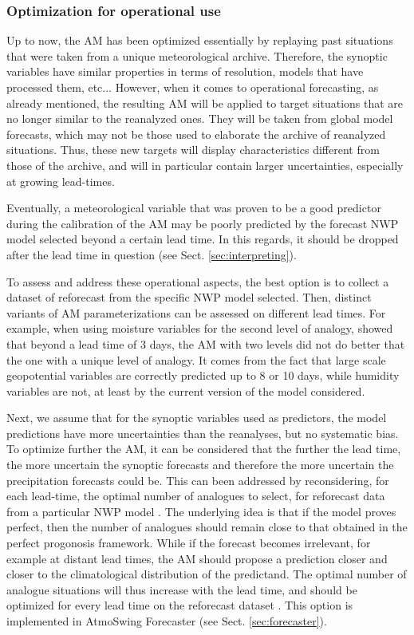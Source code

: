 \documentclass[review]{elsarticle}
\begin{document}
\subsubsection{Optimization for operational use}
\label{sec:optimization-operational}

Up to now, the AM has been optimized essentially by replaying past situations that were taken from a unique meteorological archive. Therefore, the synoptic variables have similar properties in terms of resolution, models that have processed them, etc... However, when it comes to operational forecasting, as already mentioned, the resulting AM will be applied to target situations that are no longer similar to the reanalyzed ones. They will be taken from global model forecasts, which may not be those used to elaborate the archive of reanalyzed situations. Thus, these new targets will display characteristics different from those of the archive, and will in particular contain larger uncertainties, especially at growing lead-times.

Eventually, a meteorological variable that was proven to be a good predictor during the calibration of the AM may be poorly predicted by the forecast NWP model selected beyond a certain lead time. In this regards, it should be dropped after the lead time in question (see Sect. \ref{sec:interpreting}).

To assess and address these operational aspects, the best option is to collect a dataset of reforecast from the specific NWP model selected. Then, distinct variants of AM parameterizations can be assessed on different lead times. For example, when using moisture variables for the second level of analogy, \citet{Thevenot2004} showed that beyond a lead time of 3 days, the AM with two levels did not do better that the one with a unique level of analogy. It comes from the fact that large scale geopotential variables are correctly predicted up to 8 or 10 days, while humidity variables are not, at least by the current version of the model considered.

Next, we assume that for the synoptic variables used as predictors, the model predictions have more uncertainties than the reanalyses, but no systematic bias. To optimize further the AM, it can be considered that the further the lead time, the more uncertain the synoptic forecasts and therefore the more uncertain the precipitation forecasts could be. This can been addressed by reconsidering, for each lead-time, the optimal number of analogues to select, for reforecast data from a particular NWP model \citep{Thevenot2004}. The underlying idea is that if the model proves perfect, then the number of analogues should remain close to that obtained in the perfect progonosis framework. While if the forecast becomes irrelevant, for example at distant lead times, the AM should propose a prediction closer and closer to the climatological distribution of the predictand. The optimal number of analogue situations will thus increase with the lead time, and should be optimized for every lead time on the reforecast dataset \citep[see][for the details]{Thevenot2004}. This option is implemented in AtmoSwing Forecaster (see Sect. \ref{sec:forecaster}).
\end{document}
